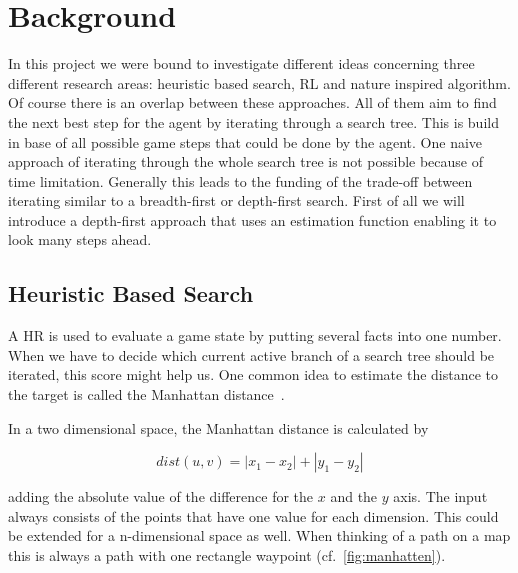 

\section{Background} 
\label{sec:back}

In this project we were bound to investigate different ideas concerning three different research areas: heuristic based search, \ac{RL} and nature inspired algorithm. 
Of course there is an overlap between these approaches. All of them aim to find the next best step for the agent by iterating through a search tree. This is build in base of all possible game steps that could be done by the agent.
One naive approach of iterating through the whole search tree is not possible because of time limitation.
Generally this leads to the funding of the trade-off between iterating similar to a breadth-first or depth-first search.
First of all we will introduce a depth-first approach that uses an estimation function enabling it to look many steps ahead.


\subsection{Heuristic Based Search} 

A \ac{HR} is used to evaluate a game state by putting several facts into one number. When we have to decide which current active branch of a search tree should be iterated, this score might help us. 
One common idea to estimate the distance to the target is called the Manhattan distance~\cite{distance_metrics}. 

In a two dimensional space, the Manhattan distance is calculated by

\begin{equation}
dist(u,v) = |x_{1} - x_{2}| + |y_{1} - y_{2}|
\end{equation}

adding the absolute value of the difference for the $x$ and the $y$ axis. The input always consists of the points that have one value for each dimension. This could be extended for a n-dimensional space as well. When thinking of a path on a map this is always a path with one rectangle waypoint (cf.~\cref{fig:manhatten}).

